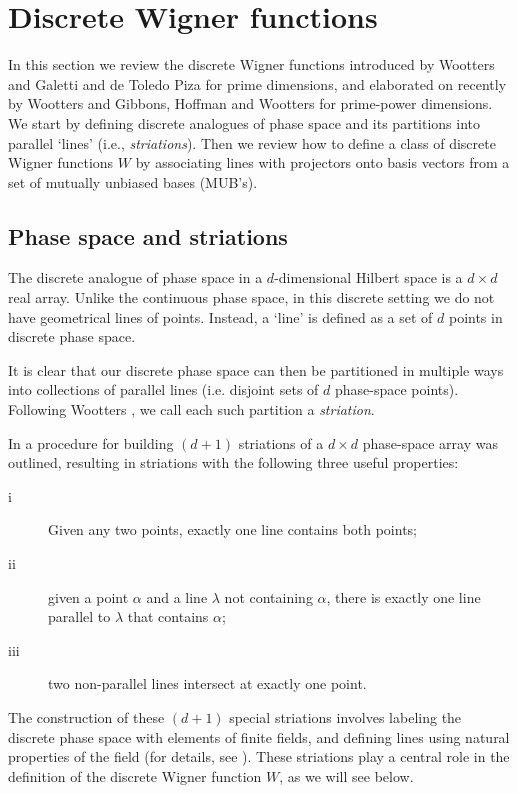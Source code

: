 \documentclass[aps,twocolumn,showpacs,nofootinbib,groupedaddress]{revtex4}
\begin{document}
\section{Discrete Wigner functions}

In this section we review the discrete Wigner functions introduced
by Wootters \cite{Wootters87} and Galetti and de Toledo Piza
\cite{GalettiP88} for prime dimensions, and elaborated on recently
by Wootters \cite{Wootters04} and Gibbons, Hoffman and Wootters
\cite{GibbonsHW04} for prime-power dimensions. We start by
defining discrete analogues of phase space and its partitions into
parallel `lines' (i.e., \textit{striations}). Then we review how
to define a class of discrete Wigner functions $W$ by associating
lines with projectors onto basis vectors from a set of mutually
unbiased bases (MUB's).

\subsection{Phase space and striations}

The discrete analogue of phase space in a $d$-dimensional Hilbert
space is a $d \times d$ real array. Unlike the continuous phase
space, in this discrete setting we do not have geometrical lines
of points. Instead, a `line' is defined as a set of $d$ points in
discrete phase space.

It is clear that our discrete phase space can then be partitioned
in multiple ways into collections of parallel lines (i.e. disjoint
sets of $d$ phase-space points). Following Wootters
\cite{Wootters04}, we call each such partition a
\textit{striation}.

In \cite{GibbonsHW04} a procedure for building $(d+1)$ striations
of a $d\times d$ phase-space array was outlined, resulting in
striations with the following three useful properties:
\begin{description}
\item[i] Given any two points, exactly one line contains both points;\label{pstria1}
\item[ii] given a point $\alpha$ and a line $\lambda$ not containing $\alpha$, there is exactly one line parallel to $\lambda$ that contains $\alpha$;\label{pstria2}
\item[iii] two non-parallel lines intersect at exactly one point. \label{pstria3}
\end{description}
The construction of these $(d+1)$ special striations involves
labeling the discrete phase space with elements of finite fields,
and defining lines using natural properties of the field (for
details, see \cite{GibbonsHW04}). These striations play a central
role in the definition of the discrete Wigner function $W$, as we
will see below.
\end{document}
